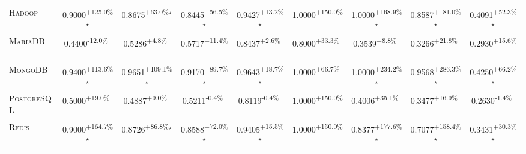 \begin{table}[htbp]
\begin{tabular}{l|cccc|cccc}
\textsc{Hadoop} & \cellcolor{green!30}0.9000\textsuperscript{+125.0\%}$^\star$ & \cellcolor{green!30}0.8675\textsuperscript{+63.0\%}$^\star$ & \cellcolor{green!30}0.8445\textsuperscript{+56.5\%}$^\star$ & \cellcolor{green!30}0.9427\textsuperscript{+13.2\%}$^\star$ & \cellcolor{green!30}1.0000\textsuperscript{+150.0\%}$^{\,\,\,}$ & \cellcolor{green!30}1.0000\textsuperscript{+168.9\%}$^\star$ & \cellcolor{green!30}0.8587\textsuperscript{+181.0\%}$^\star$ & \cellcolor{green!30}0.4091\textsuperscript{+52.3\%}$^\star$ \\
\textsc{MariaDB} & \cellcolor{red!30}0.4400\textsuperscript{-12.0\%}$^{\,\,\,}$ & \cellcolor{green!30}0.5286\textsuperscript{+4.8\%}$^{\,\,\,}$ & \cellcolor{green!30}0.5717\textsuperscript{+11.4\%}$^{\,\,\,}$ & \cellcolor{green!30}0.8437\textsuperscript{+2.6\%}$^{\,\,\,}$ & \cellcolor{green!30}0.8000\textsuperscript{+33.3\%}$^{\,\,\,}$ & \cellcolor{green!30}0.3539\textsuperscript{+8.8\%}$^{\,\,\,}$ & \cellcolor{green!30}0.3266\textsuperscript{+21.8\%}$^{\,\,\,}$ & \cellcolor{green!30}0.2930\textsuperscript{+15.6\%}$^{\,\,\,}$ \\
\textsc{MongoDB} & \cellcolor{green!30}0.9400\textsuperscript{+113.6\%}$^\star$ & \cellcolor{green!30}0.9651\textsuperscript{+109.1\%}$^\star$ & \cellcolor{green!30}0.9170\textsuperscript{+89.7\%}$^\star$ & \cellcolor{green!30}0.9643\textsuperscript{+18.7\%}$^\star$ & \cellcolor{green!30}1.0000\textsuperscript{+66.7\%}$^{\,\,\,}$ & \cellcolor{green!30}1.0000\textsuperscript{+234.2\%}$^\star$ & \cellcolor{green!30}0.9568\textsuperscript{+286.3\%}$^\star$ & \cellcolor{green!30}0.4250\textsuperscript{+66.2\%}$^\star$ \\
\textsc{PostgreSQL} & \cellcolor{green!30}0.5000\textsuperscript{+19.0\%}$^{\,\,\,}$ & \cellcolor{green!30}0.4887\textsuperscript{+9.0\%}$^{\,\,\,}$ & \cellcolor{red!30}0.5211\textsuperscript{-0.4\%}$^{\,\,\,}$ & \cellcolor{red!30}0.8119\textsuperscript{-0.4\%}$^{\,\,\,}$ & \cellcolor{green!30}1.0000\textsuperscript{+150.0\%}$^{\,\,\,}$ & \cellcolor{green!30}0.4006\textsuperscript{+35.1\%}$^{\,\,\,}$ & \cellcolor{green!30}0.3477\textsuperscript{+16.9\%}$^{\,\,\,}$ & \cellcolor{red!30}0.2630\textsuperscript{-1.4\%}$^{\,\,\,}$ \\
\textsc{Redis} & \cellcolor{green!30}0.9000\textsuperscript{+164.7\%}$^\star$ & \cellcolor{green!30}0.8726\textsuperscript{+86.8\%}$^\star$ & \cellcolor{green!30}0.8588\textsuperscript{+72.0\%}$^\star$ & \cellcolor{green!30}0.9405\textsuperscript{+15.5\%}$^\star$ & \cellcolor{green!30}1.0000\textsuperscript{+150.0\%}$^{\,\,\,}$ & \cellcolor{green!30}0.8377\textsuperscript{+177.6\%}$^\star$ & \cellcolor{green!30}0.7077\textsuperscript{+158.4\%}$^\star$ & \cellcolor{green!30}0.3431\textsuperscript{+30.3\%}$^\star$ \\

\end{tabular}
\end{table}
